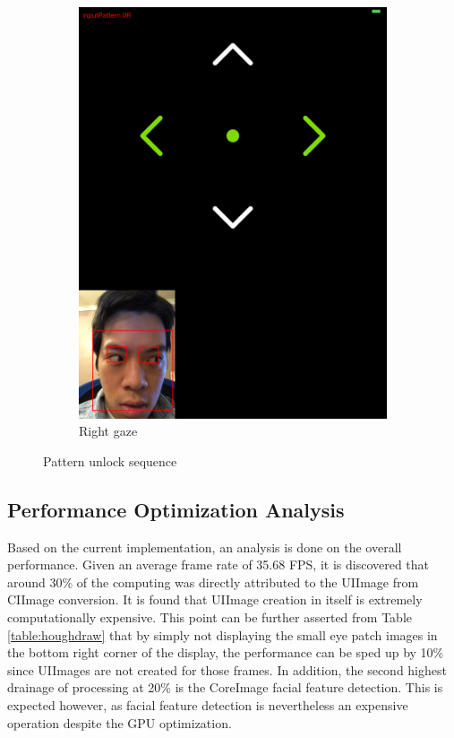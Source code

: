 \documentclass[10pt,twocolumn,letterpaper]{article}
\begin{document}
\begin{figure}[H]
\begin{subfigure}[t]{0.33\linewidth}
        \includegraphics[scale=0.045]{pattern_right}
        \caption{Right gaze}
    \end{subfigure}
    \caption{Pattern unlock sequence}
    \label{pattern}
\end{figure}

\subsection{Performance Optimization Analysis}
Based on the current implementation, an analysis is done on the overall performance.  Given an average frame rate of 35.68 FPS, it is discovered that around 30\% of the computing was directly attributed to the UIImage from CIImage conversion.  It is found that UIImage creation in itself is extremely computationally expensive.  This point can be further asserted from Table \ref{table:houghdraw} that by simply not displaying the small eye patch images in the bottom right corner of the display, the performance can be sped up by 10\% since UIImages are not created for those frames.  In addition, the second highest drainage of processing at 20\% is the CoreImage facial feature detection.  This is expected however, as facial feature detection is nevertheless an expensive operation despite the GPU optimization.
\end{document}
